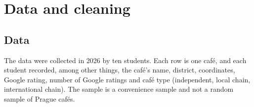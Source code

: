 \documentclass[11pt,a4paper]{article}
\begin{document}
\section{Data and cleaning}
\subsection{Data}
The data were collected in 2026 by ten students. Each row is one caf\'e, and each student recorded, among other things, the caf\'e's name, district, coordinates, Google rating, number of Google ratings and caf\'e type (independent, local chain, international chain). The sample is a convenience sample and not a random sample of Prague caf\'es.
\end{document}
